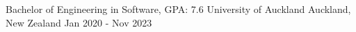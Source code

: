 
\begin{cventries}
  \cventry
    {Bachelor of Engineering in Software, GPA: 7.6} %
    {University of Auckland} %
    {Auckland, New Zealand} %
    {Jan 2020 - Nov 2023} %
    \item{}
    \vspace{-15mm}

\end{cventries}
